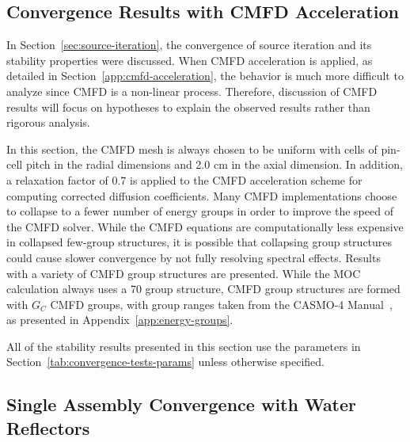 \subsection{Convergence Results with CMFD Acceleration}
\label{sec:cmfd-stab}

In Section~\ref{sec:source-iteration}, the convergence of source iteration and its stability properties were discussed. When \ac{CMFD} acceleration is applied, as detailed in Section~\ref{app:cmfd-acceleration}, the behavior is much more difficult to analyze since \ac{CMFD} is a non-linear process. Therefore, discussion of \ac{CMFD} results will focus on hypotheses to explain the observed results rather than rigorous analysis. 

In this section, the \ac{CMFD} mesh is always chosen to be uniform with cells of pin-cell pitch in the radial dimensions and 2.0 cm in the axial dimension. In addition, a relaxation factor of 0.7 is applied to the \ac{CMFD} acceleration scheme for computing corrected diffusion coefficients. Many \ac{CMFD} implementations choose to collapse to a fewer number of energy groups in order to improve the speed of the \ac{CMFD} solver. While the \ac{CMFD} equations are computationally less expensive in collapsed few-group structures, it is possible that collapsing group structures could cause slower convergence by not fully resolving spectral effects. Results with a variety of \ac{CMFD} group structures are presented. While the \ac{MOC} calculation always uses a 70 group structure, \ac{CMFD} group structures are formed with $G_C$ \ac{CMFD} groups, with group ranges taken from the CASMO-4 Manual~\cite{edenius1995casmo}, as presented in Appendix~\ref{app:energy-groups}.

All of the stability results presented in this section use the parameters in Section~\ref{tab:convergence-tests-params} unless otherwise specified.

\subsection{Single Assembly Convergence with Water Reflectors}
\label{sec:sa-axial-ref}

